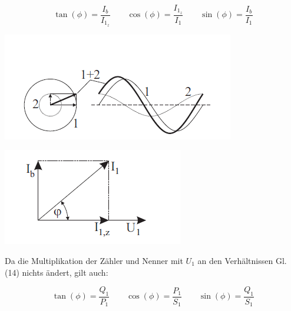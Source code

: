 \documentclass[11pt,ngerman]{scrartcl}
\begin{document}
\begin{equation}
	\tan(\phi) = \frac{I_b}{I_{1_z}} \qquad \cos(\phi) = \frac{I_{1_z}}{I_1} \qquad \sin(\phi) = \frac{I_b}{I_1}
\end{equation}

\begin{minipage}{\textwidth}
	\begin{minipage}[t]{0.6\textwidth}
		\centering
		\includegraphics[width=\textwidth]{abb6}
		\label{fig:abb6}
	\end{minipage}
	\vspace{2mm}
	\begin{minipage}[t]{0.4\textwidth}
		\centering
		\includegraphics[width=\textwidth]{abb7}
		\label{fig:abb7}
	\end{minipage}
	\vspace{1em}
\end{minipage}

Da die Multiplikation der Zähler und Nenner mit $U_1$ an den Verhältnissen Gl. (14) nichts ändert,
gilt auch:

\begin{equation}
	\tan(\phi) = \frac{Q_1}{P_1} \qquad \cos(\phi) = \frac{P_1}{S_1} \qquad \sin(\phi) = \frac{Q_1}{S_1}
\end{equation}
\end{document}
